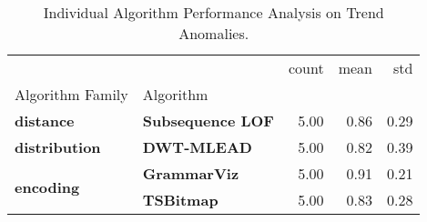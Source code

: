 \begin{table}[h]
\centering
\caption{Individual Algorithm Performance Analysis on Trend Anomalies.}
\label{tab:bp-trend}
\begin{tabular}{llrrr}
\toprule
 &  & count & mean & std \\
Algorithm Family & Algorithm &  &  &  \\
\midrule
\textbf{distance} & \textbf{Subsequence LOF} & 5.00 & 0.86 & 0.29 \\
\cline{1-5}
\textbf{distribution} & \textbf{DWT-MLEAD} & 5.00 & 0.82 & 0.39 \\
\cline{1-5}
\multirow[t]{2}{*}{\textbf{encoding}} & \textbf{GrammarViz} & 5.00 & 0.91 & 0.21 \\
\textbf{} & \textbf{TSBitmap} & 5.00 & 0.83 & 0.28 \\
\cline{1-5}
\bottomrule
\end{tabular}
\end{table}